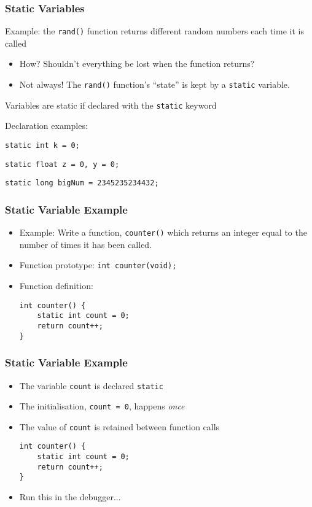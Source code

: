\documentclass[14pt]{beamer}
\begin{document}
\begin{frame}
\frametitle{Static Variables}
\begin{itemize}
\item Example: the \texttt{rand()} function returns different random numbers each time it is called
	\begin{itemize}
		\item How? Shouldn't everything be lost when the function returns?
		\item Not always! The \texttt{rand()} function's ``state'' is kept by a \texttt{static} variable.
	\end{itemize}
\pause
\item Variables are static if declared with the \texttt{static} keyword
\item Declaration examples:
\pause
{\small
\item \texttt{static int k = 0;}
\item \texttt{static float z = 0, y = 0;}
\item \texttt{static long bigNum = 2345235234432;}
}
\end{itemize}
\end{frame}

\begin{frame}[fragile]
\frametitle{Static Variable Example}
\begin{itemize}
\item Example: Write a function, \texttt{counter()} which returns an integer equal to the number of times it has been called.
\pause
\item Function prototype: \texttt{int counter(void);}
\pause
\item Function definition:
\begin{lstlisting}[style=CStyle]
int counter() {
	static int count = 0;
	return count++;
}
\end{lstlisting}
\end{itemize}
\end{frame}

\begin{frame}[fragile]
\frametitle{Static Variable Example}
\begin{itemize}
\item The variable \texttt{count} is declared \texttt{static}
\item The initialisation, \texttt{count = 0}, happens \textit{once}
\item The value of \texttt{count} is retained between function calls 
\begin{lstlisting}[style=CStyle]
int counter() {
	static int count = 0;
	return count++;
}
\end{lstlisting}
\item Run this in the debugger...
\end{itemize}
\end{frame}
\end{document}
